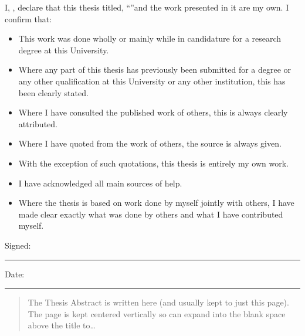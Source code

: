 \documentclass[
    11pt,
    oneside, %
    english,
    singlespacing, %
parskip, %
]{MastersDoctoralThesis}
\begin{document}
    \begin{declaration}
        \addchaptertocentry{\authorshipname} %
        \noindent I, \authorname, declare that this thesis titled, \enquote{\ttitle}and the work presented in it are my own.
        I confirm that:

        \begin{itemize}
            \item This work was done wholly or mainly while in candidature for a research degree at this University.
            \item Where any part of this thesis has previously been submitted for a degree or any other qualification at this University or any other institution, this has been clearly stated.
            \item Where I have consulted the published work of others, this is always clearly attributed.
            \item Where I have quoted from the work of others, the source is always given.
            \item With the exception of such quotations, this thesis is entirely my own work.
            \item I have acknowledged all main sources of help.
            \item Where the thesis is based on work done by myself jointly with others, I have made clear exactly what was done by others and what I have contributed myself.\\
        \end{itemize}

        \noindent Signed:\\
        \rule[0.5em]{25em}{0.5pt} %

        \noindent Date:\\
        \rule[0.5em]{25em}{0.5pt} %
    \end{declaration}



    \begin{abstract}
        \addchaptertocentry{\abstractname} %
        The Thesis Abstract is written here (and usually kept to just this page).
        The page is kept centered vertically so can expand into the blank space above the title to\ldots
    \end{abstract}
\end{document}
